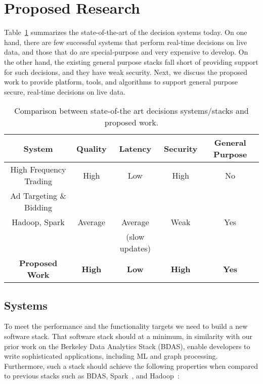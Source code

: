 \section{Proposed Research}
\label{sec:research}

Table~\ref{table:new-work} summarizes the state-of-the-art of the decision systems today. On one hand, there are few successful systems that perform real-time decisions on live data, and those that do are special-purpose and very expensive to develop. On the other hand, the existing general purpose stacks fall short of providing support for such decisions, and they have weak security. Next, we discuss the proposed work to provide platform, tools, and algorithms to support general purpose secure, real-time decisions on live data.  


\begin{table}[h]
\begin{center}
{\small
\begin{tabular}{ |c|c|c|c|c| } 
 \hline
{\bf System} & {\bf Quality} & {\bf Latency} & {\bf Security} & {\bf General Purpose}\\\hline 
High Frequency Trading & High & Low & High & No \\
Ad Targeting \& Bidding & & & & \\\hline
Hadoop, Spark & Average & Average & Weak & Yes\\
                         &               & (slow updates) & & \\\hline
{\bf Proposed Work} & {\bf High} & {\bf Low} & {\bf High} & {\bf Yes} \\\hline
\end{tabular}
}
\end{center}
\vskip -0.15in
\caption{\small{Comparison between state-of-the art decisions systems/stacks and proposed work.}}
\label{table:new-work}
\end{table}


\subsection{Systems}

To meet the performance and the functionality targets we need to build a new software stack. That software stack should at a minimum, in similarity with our prior work on the Berkeley Data Analytics Stack (BDAS), enable developers to write sophisticated applications, including ML and graph processing. Furthermore, such a stack should achieve the following properties when compared to previous stacks such as BDAS, Spark~\cite{spark}, and Hadoop~\cite{murthy2011architecture}:

